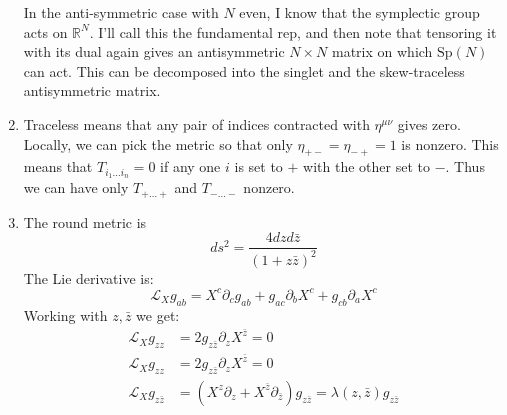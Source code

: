 \documentclass[11pt, class=article, crop=false]{standalone}
\begin{document}
\begin{enumerate}
	 In the anti-symmetric case with $N$ even, I know that the symplectic group acts on $\mathbb R^{N}$. I'll call this the fundamental rep, and then note that tensoring it with its dual again gives an antisymmetric $N \times N$ matrix on which $\mathrm{Sp}(N)$ can act. This can be decomposed into the singlet and the skew-traceless antisymmetric matrix. 
	 
	 \item Traceless means that any pair of indices contracted with $\eta^{\mu \nu}$ gives zero. Locally, we can pick the metric so that only $\eta_{+-} = \eta_{-+} = 1$ is nonzero. This means that $T_{i_1 \dots i_n} = 0$ if any one $i$ is set to $+$ with the other set to $-$. Thus we can have only $T_{+\dots+}$ and $T_{-\dots-}$ nonzero. 
	 \item The round metric is
	 \[
	 	ds^2 = \frac{4 dz d\bar z}{(1+z \bar z)^2}
	 \]
	 The Lie derivative is:
	 \begin{equation}
	 	\mathcal L_{X} g_{ab} = X^c \partial_c g_{ab} + g_{ac} \partial_b X^c + g_{cb} \partial_a X^c
	 \end{equation}
	 Working with $z, \bar z$ we get:
	 \begin{equation}
		 \begin{aligned}
		 	\mathcal L_{X} g_{zz} &= 2 g_{z \bar z} \partial_z X^{\bar z} = 0 \\
			\mathcal L_{X} g_{zz} &= 2 g_{z \bar z} \partial_z X^{\bar z} = 0\\
			\mathcal L_{X} g_{z \bar z} &= (X^z \partial_z + X^{\bar z} \partial_{\bar z} ) g_{z \bar z} = \lambda(z, \bar z) g_{z \bar z}

\end{aligned}
\end{equation}
\end{enumerate}
\end{document}

